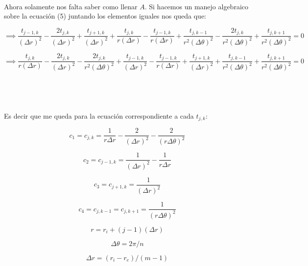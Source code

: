 ~

Ahora solamente nos falta saber como llenar $A$. Si hacemos un manejo algebraico sobre la ecuaci\'on (5) juntando los elementos iguales nos queda que:

\begin{equation*} \implies
 \frac{t_{j-1,k}}{(\Delta r)^2}
 -\frac{2t_{j,k}}{(\Delta r)^2}
 +\frac{t_{j+1,k}}{(\Delta r)^2}
 +\frac{t_{j,k}}{r(\Delta r)}
 -\frac{t_{j-1,k}}{r(\Delta r)}
 +\frac{t_{j,k-1}}{r^2(\Delta \theta)^2}
 -\frac{2t_{j,k}}{r^2(\Delta \theta)^2}
 +\frac{t_{j,k+1}}{r^2(\Delta \theta)^2} = 0
\end{equation*}

\begin{equation*} \implies
 \frac{t_{j,k}}{r(\Delta r)}
 -\frac{2t_{j,k}}{(\Delta r)^2}
 -\frac{2t_{j,k}}{r^2(\Delta \theta)^2}
 +\frac{t_{j-1,k}}{(\Delta r)^2}
 -\frac{t_{j-1,k}}{r(\Delta r)}
 +\frac{t_{j+1,k}}{(\Delta r)^2}
 +\frac{t_{j,k-1}}{r^2(\Delta \theta)^2}
 +\frac{t_{j,k+1}}{r^2(\Delta \theta)^2} = 0
\end{equation*}

~

~

Es decir que me queda para la ecuaci\'on correspondiente a cada $t_{j,k}$:

\begin{figure}[!htb]
\centering
{}
  \begin{equation}
  c_1 = c_{j,k} = \frac{1}{r\Delta r}-\frac{2}{(\Delta r)^2}-\frac{2}{(r\Delta \theta)^2}
  \end{equation}

  \begin{equation}
  c_2 = c_{j-1,k} = \frac{1}{(\Delta r)^2}-\frac{1}{r\Delta r}
  \end{equation}

  \begin{equation}
  c_3 = c_{j+1,k} = \frac{1}{(\Delta r)^2}
  \end{equation}

  \begin{equation}
  c_4 = c_{j,k-1} = c_{j,k+1} = \frac{1}{(r\Delta \theta)^2}
  \end{equation}
\endminipage\hfill
{}
  
  $$r = r_i + (j-1)(\Delta r)$$
  
  $$\Delta \theta = 2\pi/n$$
  
  $$\Delta r = (r_i-r_e)/(m-1)$$
  
\endminipage\hfill
\end{figure}

